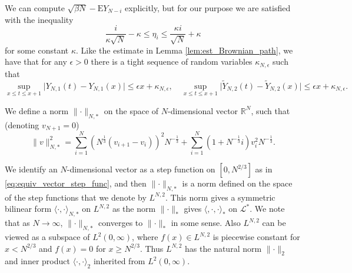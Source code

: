 \documentclass[11pt, a4paper]{article}
\numberwithin{equation}{section}
\newcommand{\E}{\mathrm{E}}
\newcommand{\realR}{\mathbb{R}}
\newcommand{\Lstar}{\mathcal{L}^*}
\theoremstyle{definition}
\theoremstyle{remark}
\begin{document}
We can compute $\sqrt{\beta N} - \E Y_{N - i}$ explicitly, but for our purpose we are satisfied with the inequality
\begin{equation} \label{eq:est_of_eta_i}
  \frac{i}{\kappa \sqrt{N}} - \kappa \leq \eta_i \leq \frac{\kappa i}{\sqrt{N}} + \kappa
\end{equation}
for some constant $\kappa$. Like the estimate in Lemma \ref{lem:est_Brownian_path}, we have that for any $\epsilon > 0$ there is a tight sequence of random variables $\kappa_{N, \epsilon}$ such that
\begin{equation} \label{eq:est_of_xi_gamma}
  \sup_{x \leq t \leq x + 1} \lvert Y_{N, 1}(t) - Y_{N, 1}(x) \rvert \leq \epsilon x + \kappa_{N, \epsilon}, \quad \sup_{x \leq t \leq x + 1} \lvert \tilde{Y}_{N, 2}(t) - \tilde{Y}_{N, 2}(x) \rvert \leq \epsilon x + \kappa_{N, \epsilon}.
\end{equation}

We define a norm $\lVert \cdot \rVert_{N, *}$ on the space of $N$-dimensional vector $\realR^N$, such that (denoting $v_{N + 1} = 0$)
\begin{equation}
  \lVert v \rVert^2_{N, *} = \sum^N_{i = 1} (N^{\frac{1}{3}}(v_{i + 1} - v_i))^2 N^{-\frac{1}{3}} + \sum^N_{i = 1} (1 + N^{-\frac{1}{3}} i) v^2_i N^{-\frac{1}{3}}.
\end{equation}

We identify an $N$-dimensional vector as a step function on $[0, N^{2/3}]$ as in \eqref{eq:equiv_vector_step_func}, and then $\lVert \cdot \rVert_{N, *}$ is a norm defined on the space of the step functions that we denote by $L^{N, 2}$. This norm gives a symmetric bilinear form $\langle \cdot, \cdot \rangle_{N, *}$ on $L^{N, 2}$ as the norm $\lVert \cdot \rVert_*$ gives $\langle, \cdot, \cdot \rangle_*$ on $\Lstar$. We note that as $N \to \infty$, $\lVert \cdot \rVert_{N, *}$ converges to $\lVert \cdot \rVert_*$ in some sense. Also $L^{N, 2}$ can be viewed as a subspace of $L^2(0, \infty)$, where $f(x) \in L^{N, 2}$ is piecewise constant for $x < N^{2/3}$ and $f(x) = 0$ for $x \geq N^{2/3}$. Thus $L^{N, 2}$ has the natural norm $\lVert \cdot \rVert_2$ and inner product $\langle \cdot, \cdot \rangle_2$ inherited from $L^2(0, \infty)$.
\end{document}
